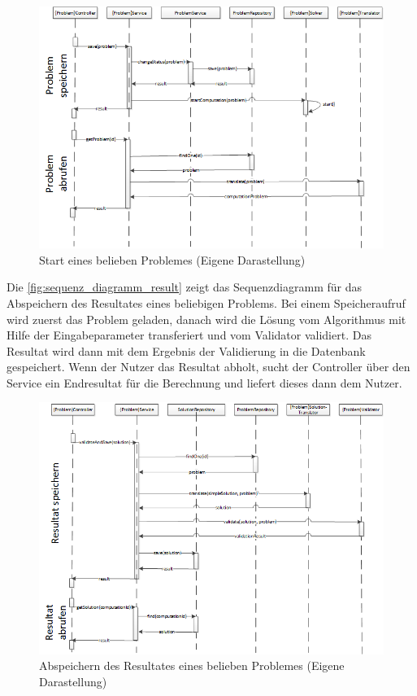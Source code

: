 \begin{figure}[h]
\centering
\includegraphics[scale=0.8]{images/visio/sequenz_diagramm_start.png}
\caption{Start eines belieben Problemes (Eigene Darastellung)}
\label{fig:sequenz_diagramm_start}
\end{figure}

Die \autoref{fig:sequenz_diagramm_result} zeigt das Sequenzdiagramm für das Abspeichern des Resultates eines beliebigen Problems. Bei einem Speicheraufruf wird zuerst das Problem geladen, danach wird die Lösung vom Algorithmus mit Hilfe der Eingabeparameter transferiert und vom Validator validiert. Das Resultat wird dann mit dem Ergebnis der Validierung in die Datenbank gespeichert. Wenn der Nutzer das Resultat abholt, sucht der Controller über den Service ein Endresultat für die Berechnung und liefert dieses dann dem Nutzer.

\begin{figure}[h]
\centering
\includegraphics[scale=0.8]{images/visio/sequenz_diagramm_result.png}
\caption{Abspeichern des Resultates eines belieben Problemes (Eigene Darastellung)}
\label{fig:sequenz_diagramm_result}
\end{figure}

